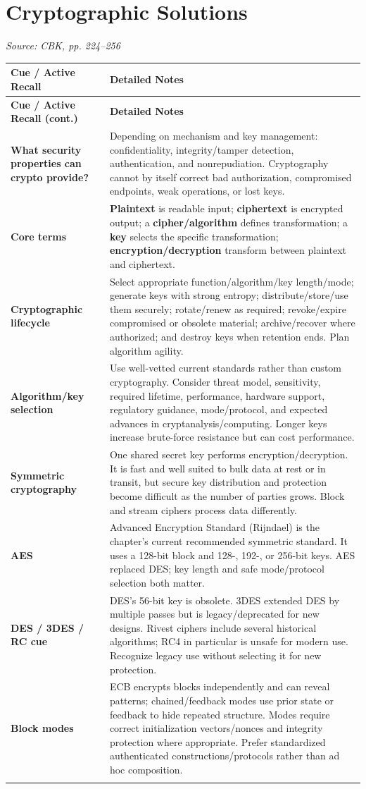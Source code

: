 \documentclass[10pt,letterpaper]{article}
\makeatletter
\newenvironment{cornell}{\rowcolors{2}{white}{notebg}\begin{longtable}{@{}>{\raggedright\arraybackslash\columncolor{cuebg}\color{navy}\bfseries}p{0.285\textwidth}>{\raggedright\arraybackslash}p{0.65\textwidth}@{}}
\rowcolor{navy}\color{white}\textbf{Cue / Active Recall} & \color{white}\textbf{Detailed Notes}\\ \hline\endfirsthead
\rowcolor{navy}\color{white}\textbf{Cue / Active Recall (cont.)} & \color{white}\textbf{Detailed Notes}\\ \hline\endhead}{\end{longtable}}
\newcommand{\noterow}[2]{#1 & #2\\\arrayrulecolor{line}\hline}
\newcommand{\source}[1]{\par{\footnotesize\color{teal}\textit{Source: CBK, #1}}\par}
\makeatother
\begin{document}
\section{\color{navy}Cryptographic Solutions}
\source{pp. 224--256}
\begin{cornell}
\noterow{What security properties can crypto provide?}{Depending on mechanism and key management: confidentiality, integrity/tamper detection, authentication, and nonrepudiation. Cryptography cannot by itself correct bad authorization, compromised endpoints, weak operations, or lost keys.}
\noterow{Core terms}{\textbf{Plaintext} is readable input; \textbf{ciphertext} is encrypted output; a \textbf{cipher/algorithm} defines transformation; a \textbf{key} selects the specific transformation; \textbf{encryption/decryption} transform between plaintext and ciphertext.}
\noterow{Cryptographic lifecycle}{Select appropriate function/algorithm/key length/mode; generate keys with strong entropy; distribute/store/use them securely; rotate/renew as required; revoke/expire compromised or obsolete material; archive/recover where authorized; and destroy keys when retention ends. Plan algorithm agility.}
\noterow{Algorithm/key selection}{Use well-vetted current standards rather than custom cryptography. Consider threat model, sensitivity, required lifetime, performance, hardware support, regulatory guidance, mode/protocol, and expected advances in cryptanalysis/computing. Longer keys increase brute-force resistance but can cost performance.}
\noterow{Symmetric cryptography}{One shared secret key performs encryption/decryption. It is fast and well suited to bulk data at rest or in transit, but secure key distribution and protection become difficult as the number of parties grows. Block and stream ciphers process data differently.}
\noterow{AES}{Advanced Encryption Standard (Rijndael) is the chapter's current recommended symmetric standard. It uses a 128-bit block and 128-, 192-, or 256-bit keys. AES replaced DES; key length and safe mode/protocol selection both matter.}
\noterow{DES / 3DES / RC cue}{DES's 56-bit key is obsolete. 3DES extended DES by multiple passes but is legacy/deprecated for new designs. Rivest ciphers include several historical algorithms; RC4 in particular is unsafe for modern use. Recognize legacy use without selecting it for new protection.}
\noterow{Block modes}{ECB encrypts blocks independently and can reveal patterns; chained/feedback modes use prior state or feedback to hide repeated structure. Modes require correct initialization vectors/nonces and integrity protection where appropriate. Prefer standardized authenticated constructions/protocols rather than ad hoc composition.}

\end{cornell}
\end{document}
